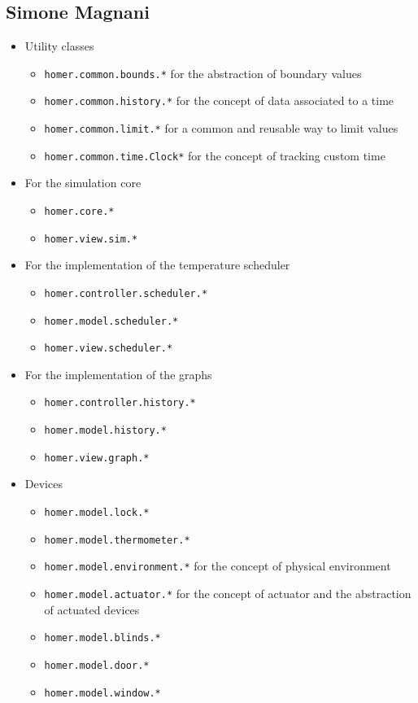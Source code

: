 \subsection{Simone Magnani}
\begin{itemize}
    \item Utility classes
    \begin{itemize}
        \item \texttt{homer.common.bounds.*} for the abstraction of boundary values
        \item \texttt{homer.common.history.*} for the concept of data associated to a time
        \item \texttt{homer.common.limit.*} for a common and reusable way to limit values
        \item \texttt{homer.common.time.Clock*} for the concept of tracking custom time
    \end{itemize}
    \item For the simulation core
    \begin{itemize}
        \item \texttt{homer.core.*}
        \item \texttt{homer.view.sim.*}
    \end{itemize}
    \item For the implementation of the temperature scheduler
    \begin{itemize}
        \item \texttt{homer.controller.scheduler.*}
        \item \texttt{homer.model.scheduler.*}
        \item \texttt{homer.view.scheduler.*}
    \end{itemize}
    \item For the implementation of the graphs
    \begin{itemize}
        \item \texttt{homer.controller.history.*}
        \item \texttt{homer.model.history.*}
        \item \texttt{homer.view.graph.*} 
    \end{itemize}
    \item Devices
    \begin{itemize}
        \item \texttt{homer.model.lock.*}
        \item \texttt{homer.model.thermometer.*}
        \item \texttt{homer.model.environment.*} for the concept of physical environment
        \item \texttt{homer.model.actuator.*} for the concept of actuator and the abstraction of actuated devices
        \item \texttt{homer.model.blinds.*}
        \item \texttt{homer.model.door.*}
        \item \texttt{homer.model.window.*}
    \end{itemize}
\end{itemize}

